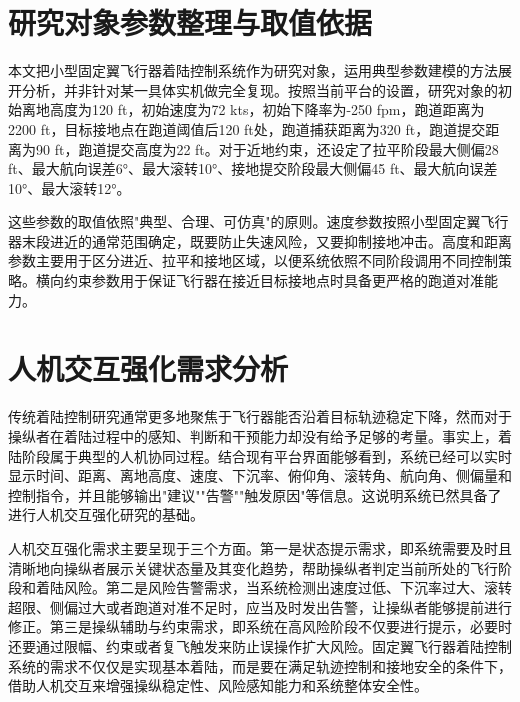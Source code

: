 \section{研究对象参数整理与取值依据}

本文把小型固定翼飞行器着陆控制系统作为研究对象，运用典型参数建模的方法展开分析，并非针对某一具体实机做完全复现。按照当前平台的设置，研究对象的初始离地高度为120 ft，初始速度为72 kts，初始下降率为-250 fpm，跑道距离为2200 ft，目标接地点在跑道阈值后120 ft处，跑道捕获距离为320 ft，跑道提交距离为90 ft，跑道提交高度为22 ft。对于近地约束，还设定了拉平阶段最大侧偏28 ft、最大航向误差6°、最大滚转10°、接地提交阶段最大侧偏45 ft、最大航向误差10°、最大滚转12°。

这些参数的取值依照"典型、合理、可仿真"的原则。速度参数按照小型固定翼飞行器末段进近的通常范围确定，既要防止失速风险，又要抑制接地冲击。高度和距离参数主要用于区分进近、拉平和接地区域，以便系统依照不同阶段调用不同控制策略。横向约束参数用于保证飞行器在接近目标接地点时具备更严格的跑道对准能力。

\section{人机交互强化需求分析}

传统着陆控制研究通常更多地聚焦于飞行器能否沿着目标轨迹稳定下降，然而对于操纵者在着陆过程中的感知、判断和干预能力却没有给予足够的考量。事实上，着陆阶段属于典型的人机协同过程。结合现有平台界面能够看到，系统已经可以实时显示时间、距离、离地高度、速度、下沉率、俯仰角、滚转角、航向角、侧偏量和控制指令，并且能够输出"建议""告警""触发原因"等信息。这说明系统已然具备了进行人机交互强化研究的基础。

人机交互强化需求主要呈现于三个方面。第一是状态提示需求，即系统需要及时且清晰地向操纵者展示关键状态量及其变化趋势，帮助操纵者判定当前所处的飞行阶段和着陆风险。第二是风险告警需求，当系统检测出速度过低、下沉率过大、滚转超限、侧偏过大或者跑道对准不足时，应当及时发出告警，让操纵者能够提前进行修正。第三是操纵辅助与约束需求，即系统在高风险阶段不仅要进行提示，必要时还要通过限幅、约束或者复飞触发来防止误操作扩大风险。固定翼飞行器着陆控制系统的需求不仅仅是实现基本着陆，而是要在满足轨迹控制和接地安全的条件下，借助人机交互来增强操纵稳定性、风险感知能力和系统整体安全性。
